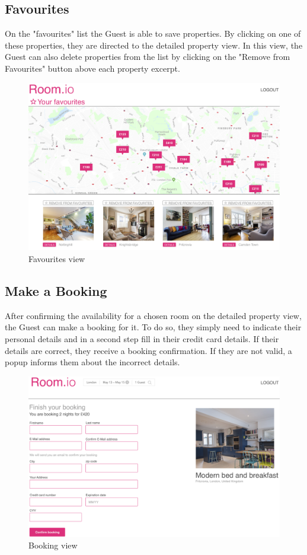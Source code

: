 \subsection{Favourites}
On the "favourites" list the Guest is able to save properties. By clicking on one of these properties, they are directed to the detailed property view. In this view, the Guest can also delete properties from the list by clicking on the "Remove from Favourites" button above each property excerpt.

\begin{figure}[H]
  \centering
  \includegraphics[width=17cm]{img/mockups/guest_favorites.png}
  \caption{Favourites view}
  \label{Favorites_View}
\end{figure}

\subsection{Make a Booking}
After confirming the availability for a chosen room on the detailed property view, the Guest can make a booking for it. To do so, they simply need to indicate their personal details and in a second step fill in their credit card details. If their details are correct, they receive a booking confirmation. If they are not valid, a popup informs them about the incorrect details.

\begin{figure}[H]
  \centering
  \includegraphics[width=17cm]{img/mockups/guest_booking.png}
  \caption{Booking view}
  \label{Booking_View}
\end{figure}

